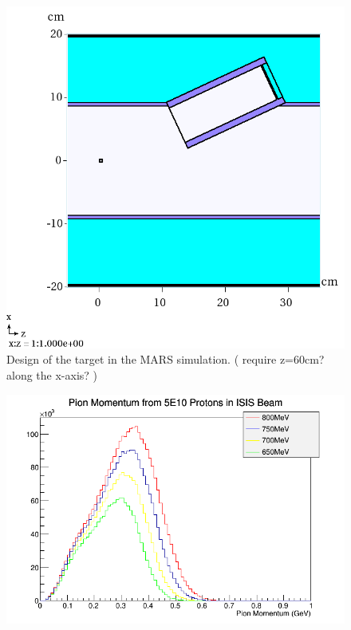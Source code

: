 \documentclass[a4paper,11pt]{article}
\begin{document}
\begin{figure}[t!]
  \begin{center}
    \includegraphics[width=1.0\columnwidth]{./figures/MARSv2TargetVent.png}
    \caption{Design of the target in the MARS simulation. ( require z=60cm?along the x-axis? ) }
    \label{fig:MARSvent}
  \end{center}
\end{figure}

\begin{figure}[t!]
  \begin{center}
    \includegraphics[width=1.0\columnwidth]{./figures/PiMomentum.png}
    \caption{}
    \label{fig:PiMomentum}
  \end{center}
\end{figure}
\end{document}
